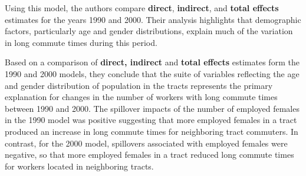 \documentclass[english,12pt]{book}\usepackage[]{graphicx}\usepackage[]{xcolor}
\begin{document}
\begin{example}
Using this model, the authors compare \textbf{direct}, \textbf{indirect}, and \textbf{total effects} estimates for the years 1990 and 2000. Their analysis highlights that demographic factors, particularly age and gender distributions, explain much of the variation in long commute times during this period.
 
Based on a comparison of \textbf{direct, indirect} and \textbf{total effects} estimates form the 1990 and 2000 models, they conclude that the suite of variables reflecting the age and gender distribution of population in the tracts represents the primary explanation for changes in the number of workers with long commute times between 1990 and 2000. The spillover impacts of the number of employed females in the 1990 model was positive suggesting that more employed females in a tract produced an increase in long commute times for neighboring tract commuters. In contrast, for the 2000 model, spillovers associated with employed females were negative, so that more employed females in a tract reduced long commute times for workers located in neighboring tracts. 
\end{example}
\end{document}
